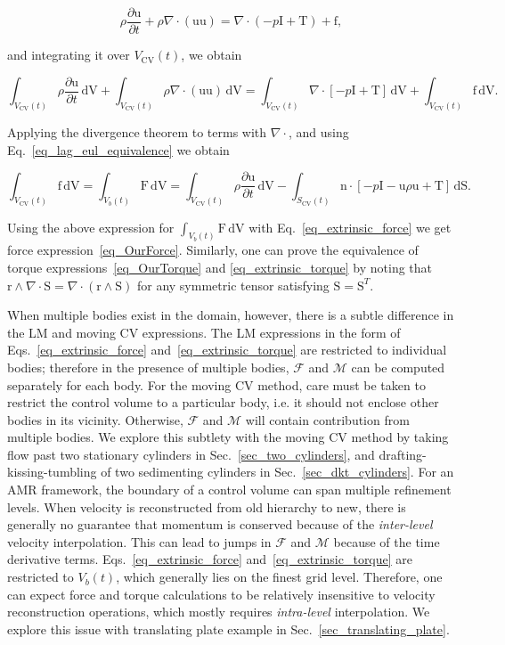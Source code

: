 \documentclass[review]{elsarticle}
\newcommand \D [2]{\frac{\partial #1}{\partial #2}}
\renewcommand{\vec}[1]{\bm{\mathrm{#1}}}
\def \div{\nabla \cdot \mbox{}}
\def \n{\vec{n}}
\def \r{\vec{r}}
\def \u{\vec{u}}
\def \I{\vec{I}}
\def \F{\vec{F}}
\def \T{\vec{T}}
\def \cM{\vec{\mathcal{M}}}
\def  \Scvt{S_\text{CV}(t)}
\def \Vbt{V_b(t)}
\def  \Vcvt{V_\text{CV}(t)}
\def \cF{\vec{\mathcal{F}}}
\def \F{\vec{F}}
\def \I{\vec{I}}
\def \f{\vec{f}}
\def \n{\vec{n}}
\def \S{\vec{S}}
\def \u{\vec{u}}
\def \div{\nabla \cdot \mbox{}}
\def \dS{\,\mathrm{dS}}
\def \dV{\,\mathrm{dV}}
\def \ndot{\n \cdot}
\def \rcross{\r \wedge}
\newcommand{\REVIEW}[1]{{#1}}
\begin{document}
\begin{equation}
\rho \D{\u}{t} + \rho \div (\u \u)
= \div (- p \I +  \T) + \f, \label{eqn_conservative_momentum_form}
\end{equation}

\noindent and integrating it over $\Vcvt$, we obtain

\begin{equation}
\int_{\Vcvt} \rho \D{\u}{t} \dV
+ \int_{\Vcvt} \rho \div (\u \u) \dV
= \int_{\Vcvt} \div \left[-p\I + \T \right] \dV 
+ \int_{\Vcvt} \f \dV. \nonumber
\end{equation}

\noindent Applying the divergence theorem to terms with $\div$, and using 
Eq.~\eqref{eq_lag_eul_equivalence} we obtain

\begin{equation}
\label{eq_sumLag_CV}
\int_{\Vcvt} \f \dV = \int_{\Vbt} \F \dV =   \int_{\Vcvt} \rho \D{\u}{t} \dV
- \int_{\Scvt} \ndot \left[-p\I - \u \rho \u+ \T \right] \dS. 
\end{equation}

\noindent Using the above expression for $\int_{\Vbt} \F \dV$ with Eq.~\eqref{eq_extrinsic_force}
we get force expression~\eqref{eq_OurForce}. Similarly, one can prove the equivalence of
torque expressions~\eqref{eq_OurTorque} and \eqref{eq_extrinsic_torque} by noting that
$\rcross \div \S = \div (\rcross \S)$ for any symmetric tensor satisfying $\S = \S^T$.

When multiple bodies exist in the domain, however, there is a subtle difference in the LM
and moving CV expressions. The LM expressions in the form of Eqs.~\eqref{eq_extrinsic_force}
and~\eqref{eq_extrinsic_torque} are restricted to individual bodies; therefore in the presence
of multiple bodies, $\cF$ and $\cM$ can be computed separately for each body. 
For the moving CV method, care must be taken to restrict the control volume to 
a particular body, i.e. it should not enclose other bodies in its vicinity. Otherwise,  
$\cF$ and $\cM$ will contain contribution from multiple bodies. We explore this 
subtlety with the moving CV method by taking flow past two stationary cylinders in 
Sec.~\ref{sec_two_cylinders}, \REVIEW{and drafting-kissing-tumbling of two 
sedimenting cylinders in Sec.~\ref{sec_dkt_cylinders}}. For an AMR framework, the boundary of a control 
volume can span multiple refinement levels. When velocity is reconstructed from old hierarchy
to new, there is generally no guarantee that momentum is conserved because of the 
\emph{inter-level} velocity interpolation. This can lead to jumps in $\cF$ and $\cM$ because 
of the time derivative terms. Eqs.~\eqref{eq_extrinsic_force} 
and~\eqref{eq_extrinsic_torque} are restricted to $\Vbt$, which generally 
lies on the finest grid level. Therefore, one can expect force and torque calculations 
to be relatively insensitive to velocity reconstruction operations, which mostly 
requires \emph{intra-level} interpolation. We explore this issue with translating plate 
example in Sec.~\ref{sec_translating_plate}.
\end{document}
